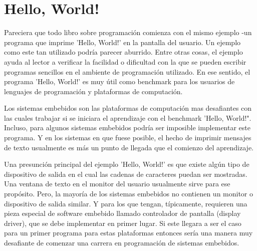 \documentclass[output=paper, 
colorlinks,
citecolor=brown,
newtxmath
]{langscibook}
\begin{document}

\def\maketitle{

 \makeatletter
 {\color{bl} \centering \huge \sc \textbf{
\large \vspace*{-8pt} \color{black} Programación de Sistemas Embebidos
 \vspace*{8pt} }\par}
 \makeatother


 \makeatletter
 {\centering \small 
 	Departamento de Ingeniería de Computadoras \\
 	Facultad de Informática - Universidad Nacional del Comahue \\
 	\vspace{20pt} }
 \makeatother

}










\section {Hello, World!}

Pareciera que todo libro sobre programación comienza con el mismo ejemplo -un programa que imprime 'Hello, World!' en la pantalla del usuario. Un ejemplo como este tan utilizado podría parecer aburrido.
Entre otras cosas, el ejemplo ayuda al lector a verificar la facilidad o dificultad con la que se pueden escribir programas sencillos en el ambiente de programación utilizado. En ese sentido, el programa 'Hello, World!' es muy útil como benchmark para los usuarios de lenguajes de programación y plataformas de computación.

Los sistemas embebidos son las plataformas de computación mas desafiantes con las cuales trabajar si se iniciara el aprendizaje con el benchmark 'Hello, World!". Incluso, para algunos sistemas embebidos podría ser imposible implementar este programa. Y en los sistemas en que fuese posible, el hecho de imprimir mensajes de texto usualmente es más un punto de llegada que el comienzo del aprendizaje.

Una presunción principal del ejemplo 'Hello, World!' es que existe algún tipo de dispositivo de salida en el cual las cadenas de caracteres puedan ser mostradas. Una ventana de texto en el monitor del usuario usualmente sirve para ese propósito. Pero, la mayoría de los sistemas embebidos no contienen un monitor o dispositivo de salida similar. Y para los que tengan, típicamente, requieren una pieza especial de software embebido llamado controlador de pantalla (display driver), que se debe implementar en primer lugar. Si este llegara a ser el caso para un primer programa para estas plataformas entonces sería una manera muy desafiante de comenzar una carrera en programación de sistemas embebidos.
\end{document}
